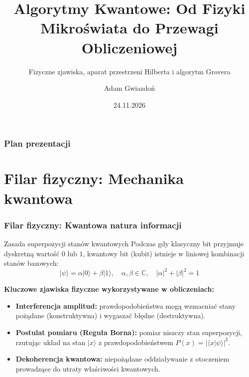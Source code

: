 \documentclass[aspectratio=169]{beamer}
\title[Algorytmy Kwantowe]{Algorytmy Kwantowe: Od Fizyki Mikroświata do Przewagi Obliczeniowej}
\subtitle{Fizyczne zjawiska, aparat przestrzeni Hilberta i algorytm Grovera}
\author[Informatyka Kwantowa]{Adam Gwiazdoń}
\date{24.11.2026}
\newcommand{\ket}[1]{\lvert #1 \rangle}
\newcommand{\braket}[2]{\langle #1 \vert #2 \rangle}
\begin{document}
\begin{frame}
    \titlepage
\end{frame}

\begin{frame}
    \frametitle{Plan prezentacji}
    \tableofcontents
\end{frame}

\section{Filar fizyczny: Mechanika kwantowa}
\begin{frame}
    \frametitle{Filar fizyczny: Kwantowa natura informacji}
    
    \begin{block}{Zasada superpozycji stanów kwantowych}
        Podczas gdy klasyczny bit przyjmuje dyskretną wartość $0$ lub $1$, kwantowy bit (kubit) istnieje w liniowej kombinacji stanów bazowych:
        \begin{equation*}
            \ket{\psi} = \alpha \ket{0} + \beta \ket{1}, \quad \alpha, \beta \in \mathbb{C}, \quad |\alpha|^2 + |\beta|^2 = 1
        \end{equation*}
    \end{block}

    \vspace{0.3cm}
    \textbf{Kluczowe zjawiska fizyczne wykorzystywane w obliczeniach:}
    \begin{itemize}
        \item \textbf{Interferencja amplitud:} prawdopodobieństwa mogą wzmacniać stany pożądane (konstruktywna) i wygaszać błędne (destruktywna).
        \item \textbf{Postulat pomiaru (Reguła Borna):} pomiar niszczy stan superpozycji, rzutując układ na stan $\ket{x}$ z prawdopodobieństwem $P(x) = |\braket{x}{\psi}|^2$.
        \item \textbf{Dekoherencja kwantowa:} niepożądane oddziaływanie z otoczeniem prowadzące do utraty właściwości kwantowych.
    \end{itemize}
\end{frame}
\end{document}
